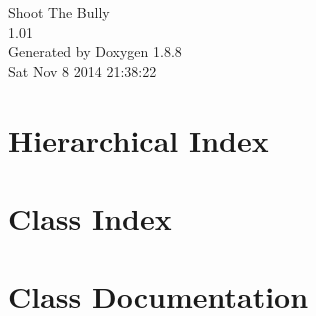 \documentclass[twoside]{book}
\newcommand{\+}{\discretionary{\mbox{\scriptsize$\hookleftarrow$}}{}{}}
\newcommand{\clearemptydoublepage}{%
  \newpage{\pagestyle{empty}\cleardoublepage}%
}
\begin{document}
\hypersetup{pageanchor=false,
             bookmarks=true,
             bookmarksnumbered=true,
             pdfencoding=unicode
            }
\begin{titlepage}
\vspace*{7cm}
\begin{center}%
{\Large Shoot The Bully \\[1ex]\large 1.\+01 }\\
\vspace*{1cm}
{\large Generated by Doxygen 1.8.8}\\
\vspace*{0.5cm}
{\small Sat Nov 8 2014 21:38:22}\\
\end{center}
\end{titlepage}
\clearemptydoublepage
\tableofcontents
\clearemptydoublepage
{}
\hypersetup{pageanchor=true}

\chapter{Hierarchical Index}

\chapter{Class Index}

\chapter{Class Documentation}




























































\newpage
{}
{}
\printindex
\end{document}

